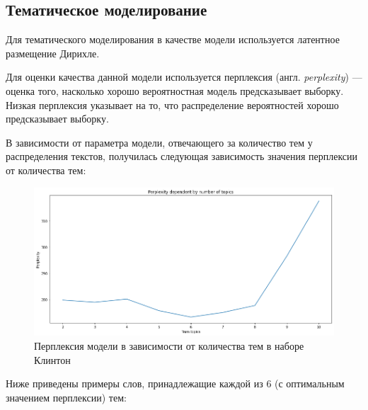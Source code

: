 \subsection{Тематическое моделирование}

Для тематического моделирования в качестве модели используется латентное размещение Дирихле.

Для оценки качества данной модели используется перплексия (англ. \textit{perplexity}) --- оценка того, насколько хорошо вероятностная модель предсказывает выборку. Низкая перплексия указывает на то, что распределение вероятностей хорошо предсказывает выборку. 

В зависимости от параметра модели, отвечающего за количество тем у распределения текстов, получилась следующая зависимость значения перплексии от количества тем:


\begin{figure}[H]
\centering
\includegraphics[scale=0.5]{pics/perplexity.png}
\caption{Перплексия модели в зависимости от количества тем в наборе Клинтон}
\end{figure}



Ниже приведены примеры слов, принадлежащие каждой из 6 (с оптимальным значением перплексии) тем:

